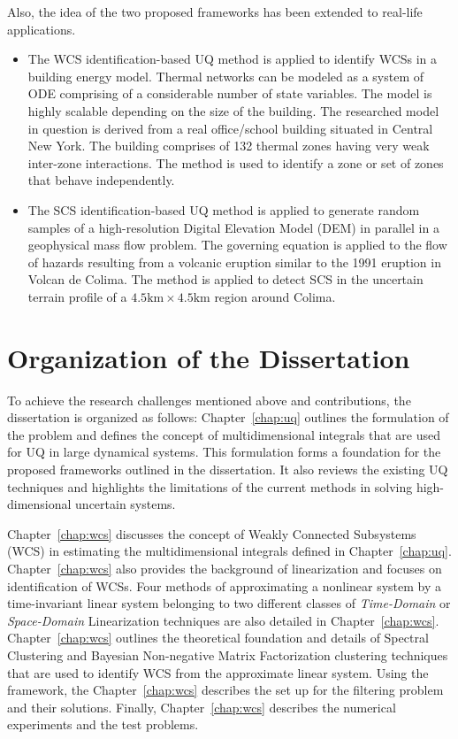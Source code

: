 Also, the idea of the two proposed frameworks has been extended to real-life applications. 
\begin{itemize} 
\item The WCS identification-based UQ method is applied to identify WCSs in a building energy model. Thermal networks can be modeled as a system of ODE comprising of a considerable number of state variables. The model is highly scalable depending on the size of the building. The researched model in question is derived from a real office/school building situated in Central New York. The building comprises of 132 thermal zones having very weak inter-zone interactions. The method is used to identify a zone or set of zones that behave independently.
\item The SCS identification-based UQ method is applied to generate random samples of a high-resolution Digital Elevation Model (DEM) in parallel in a geophysical mass flow problem. The governing equation is applied to the flow of hazards resulting from a volcanic eruption similar to the 1991 eruption in Volcan de Colima. The method is applied to detect SCS in the uncertain terrain profile of a $4.5 \text{km} \times 4.5 \text{km}$ region around Colima.
\end{itemize}


\section{Organization of the Dissertation}


To achieve the research challenges mentioned above and contributions, the dissertation is organized as follows:
Chapter~\ref{chap:uq} outlines the formulation of the problem and defines the concept of multidimensional integrals that are used for UQ in large dynamical systems. This formulation forms a foundation for the proposed frameworks outlined in the dissertation. It also reviews the existing UQ techniques and highlights the limitations of the current methods in solving high-dimensional uncertain systems.


Chapter~\ref{chap:wcs} discusses the concept of Weakly Connected Subsystems (WCS) in estimating the multidimensional integrals defined in Chapter~\ref{chap:uq}. Chapter~\ref{chap:wcs} also provides the background of linearization and focuses on identification of WCSs. Four methods of approximating a nonlinear system by a time-invariant linear system belonging to two different classes of \textit{Time-Domain} or \textit{Space-Domain} Linearization techniques are also detailed in Chapter~\ref{chap:wcs}. Chapter~\ref{chap:wcs} outlines the theoretical foundation and details of Spectral Clustering and Bayesian Non-negative Matrix Factorization clustering techniques that are used to identify WCS from the approximate linear system. Using the framework, the Chapter~\ref{chap:wcs} describes the set up for the filtering problem and their solutions. Finally, Chapter~\ref{chap:wcs} describes the numerical experiments and the test problems.


